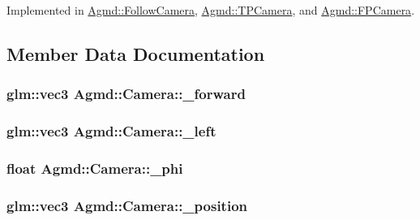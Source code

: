 Implemented in \hyperlink{class_agmd_1_1_follow_camera_a7333f2458e8545bc9958e6fbb7013f62}{Agmd\+::\+Follow\+Camera}, \hyperlink{class_agmd_1_1_t_p_camera_a58a0ed04fc0335f665f826f2a7e4b8b0}{Agmd\+::\+T\+P\+Camera}, and \hyperlink{class_agmd_1_1_f_p_camera_ae46147dbb6541ed1c13b4c864c41df42}{Agmd\+::\+F\+P\+Camera}.



\subsection{Member Data Documentation}
\hypertarget{class_agmd_1_1_camera_af36c6b7b2419529cb265b2a8da3b579c}{
\subsubsection[{\+\_\+forward}]{\setlength{\rightskip}{0pt plus 5cm}glm\+::vec3 Agmd\+::\+Camera\+::\+\_\+forward\hspace{0.3cm}{\ttfamily [protected]}}}\label{class_agmd_1_1_camera_af36c6b7b2419529cb265b2a8da3b579c}
\hypertarget{class_agmd_1_1_camera_ad817062da73e5dc518b75c2efe7ccd73}{
\subsubsection[{\+\_\+left}]{\setlength{\rightskip}{0pt plus 5cm}glm\+::vec3 Agmd\+::\+Camera\+::\+\_\+left\hspace{0.3cm}{\ttfamily [protected]}}}\label{class_agmd_1_1_camera_ad817062da73e5dc518b75c2efe7ccd73}
\hypertarget{class_agmd_1_1_camera_af9f05763599f38fe0272c47b706a114c}{
\subsubsection[{\+\_\+phi}]{\setlength{\rightskip}{0pt plus 5cm}float Agmd\+::\+Camera\+::\+\_\+phi\hspace{0.3cm}{\ttfamily [protected]}}}\label{class_agmd_1_1_camera_af9f05763599f38fe0272c47b706a114c}
\hypertarget{class_agmd_1_1_camera_a92ede17c10b580308add870fb70270c5}{
\subsubsection[{\+\_\+position}]{\setlength{\rightskip}{0pt plus 5cm}glm\+::vec3 Agmd\+::\+Camera\+::\+\_\+position\hspace{0.3cm}{\ttfamily [protected]}}}\label{class_agmd_1_1_camera_a92ede17c10b580308add870fb70270c5}
